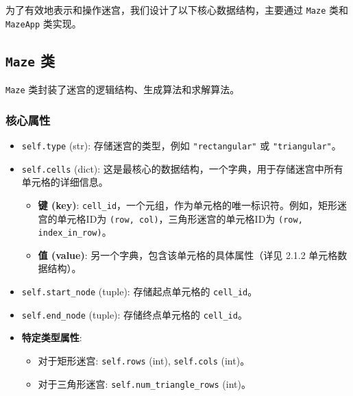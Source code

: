 \documentclass[UTF8]{report}
\theoremstyle{MyLineTheoremStyle} %
\theoremstyle{MyBlockTheoremStyle} %
\theoremstyle{MySubsubsectionStyle} %
\begin{document}
为了有效地表示和操作迷宫，我们设计了以下核心数据结构，主要通过 \texttt{Maze} 类和 \texttt{MazeApp} 类实现。

\subsection{\texttt{Maze} 类}
\texttt{Maze} 类封装了迷宫的逻辑结构、生成算法和求解算法。

\subsubsection{核心属性}
\begin{itemize}
    \item \texttt{self.type} (str): 存储迷宫的类型，例如 \texttt{"rectangular"} 或 \texttt{"triangular"}。
    \item \texttt{self.cells} (dict): 这是最核心的数据结构，一个字典，用于存储迷宫中所有单元格的详细信息。
    \begin{itemize}
        \item \textbf{键 (key)}: \texttt{cell\_id}，一个元组，作为单元格的唯一标识符。例如，矩形迷宫的单元格ID为 \texttt{(row, col)}，三角形迷宫的单元格ID为 \texttt{(row, index\_in\_row)}。
        \item \textbf{值 (value)}: 另一个字典，包含该单元格的具体属性（详见 2.1.2 单元格数据结构）。
    \end{itemize}
    \item \texttt{self.start\_node} (tuple): 存储起点单元格的 \texttt{cell\_id}。
    \item \texttt{self.end\_node} (tuple): 存储终点单元格的 \texttt{cell\_id}。
    \item \textbf{特定类型属性}:
    \begin{itemize}
        \item 对于矩形迷宫: \texttt{self.rows} (int), \texttt{self.cols} (int)。
        \item 对于三角形迷宫: \texttt{self.num\_triangle\_rows} (int)。
    \end{itemize}
\end{itemize}
\end{document}
